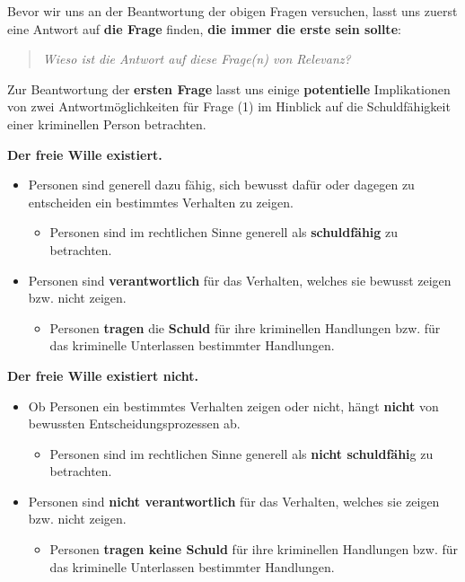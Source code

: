 \documentclass[
  a4paper,
]{report}
\providecommand{\tightlist}{%
  \setlength{\itemsep}{0pt}\setlength{\parskip}{0pt}}
\begin{document}
Bevor wir uns an der Beantwortung der obigen Fragen versuchen, lasst uns zuerst eine Antwort auf \textbf{die Frage} finden, \textbf{die immer die erste sein sollte}:

\begin{quote}
\emph{Wieso ist die Antwort auf diese Frage(n) von Relevanz?}
\end{quote}

Zur Beantwortung der \textbf{ersten Frage} lasst uns einige \textbf{potentielle} Implikationen von zwei Antwortmöglichkeiten für Frage (1) im Hinblick auf die Schuldfähigkeit einer kriminellen Person betrachten.

\textbf{Der freie Wille existiert.}

\begin{itemize}
\item
  Personen sind generell dazu fähig, sich bewusst dafür oder dagegen zu entscheiden ein bestimmtes Verhalten zu zeigen.

  \begin{itemize}
  \tightlist
  \item
    Personen sind im rechtlichen Sinne generell als \textbf{schuldfähig} zu betrachten.
  \end{itemize}
\item
  Personen sind \textbf{verantwortlich} für das Verhalten, welches sie bewusst zeigen bzw. nicht zeigen.

  \begin{itemize}
  \tightlist
  \item
    Personen \textbf{tragen} die \textbf{Schuld} für ihre kriminellen Handlungen bzw. für das kriminelle Unterlassen bestimmter Handlungen.
  \end{itemize}
\end{itemize}

\textbf{Der freie Wille existiert nicht.}

\begin{itemize}
\item
  Ob Personen ein bestimmtes Verhalten zeigen oder nicht, hängt \textbf{nicht} von bewussten Entscheidungsprozessen ab.

  \begin{itemize}
  \tightlist
  \item
    Personen sind im rechtlichen Sinne generell als \textbf{nicht schuldfähi}g zu betrachten.
  \end{itemize}
\end{itemize}

\begin{itemize}
\item
  Personen sind \textbf{nicht verantwortlich} für das Verhalten, welches sie zeigen bzw. nicht zeigen.

  \begin{itemize}
  \tightlist
  \item
    Personen \textbf{tragen keine Schuld} für ihre kriminellen Handlungen bzw. für das kriminelle Unterlassen bestimmter Handlungen.
  \end{itemize}
\end{itemize}
\end{document}
